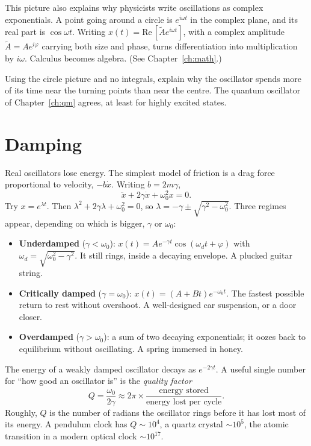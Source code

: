 This picture also explains why physicists write oscillations as complex exponentials. A point going around a circle is $e^{i\omega t}$ in the complex plane, and its real part is $\cos\omega t$. Writing $x(t) = \mathrm{Re}\,[\tilde A e^{i\omega t}]$, with a complex amplitude $\tilde A = Ae^{i\varphi}$ carrying both size and phase, turns differentiation into multiplication by $i\omega$. Calculus becomes algebra. (See Chapter~\ref{ch:math}.)

\begin{exercise}
Using the circle picture and no integrals, explain why the oscillator spends more of its time near the turning points than near the centre. The quantum oscillator of Chapter~\ref{ch:qm} agrees, at least for highly excited states.
\end{exercise}

\section{Damping}

Real oscillators lose energy. The simplest model of friction is a drag force proportional to velocity, $-b\dot x$. Writing $b = 2m\gamma$,
\[
  \ddot x + 2\gamma \dot x + \omega_0^2 x = 0 .
\]
Try $x = e^{\lambda t}$. Then $\lambda^2 + 2\gamma\lambda + \omega_0^2 = 0$, so $\lambda = -\gamma \pm \sqrt{\gamma^2 - \omega_0^2}$. Three regimes appear, depending on which is bigger, $\gamma$ or $\omega_0$:
\begin{itemize}[itemsep=3pt]
  \item \textbf{Underdamped} ($\gamma < \omega_0$): $x(t) = Ae^{-\gamma t}\cos(\omega_d t + \varphi)$ with $\omega_d = \sqrt{\omega_0^2-\gamma^2}$. It still rings, inside a decaying envelope. A plucked guitar string.
  \item \textbf{Critically damped} ($\gamma = \omega_0$): $x(t) = (A + Bt)e^{-\omega_0 t}$. The fastest possible return to rest without overshoot. A well-designed car suspension, or a door closer.
  \item \textbf{Overdamped} ($\gamma > \omega_0$): a sum of two decaying exponentials; it oozes back to equilibrium without oscillating. A spring immersed in honey.
\end{itemize}
The energy of a weakly damped oscillator decays as $e^{-2\gamma t}$. A useful single number for ``how good an oscillator is'' is the \emph{quality factor}
\[
  Q = \frac{\omega_0}{2\gamma} \approx 2\pi\times\frac{\text{energy stored}}{\text{energy lost per cycle}}.
\]
Roughly, $Q$ is the number of radians the oscillator rings before it has lost most of its energy. A pendulum clock has $Q\sim 10^4$, a quartz crystal $\sim 10^5$, the atomic transition in a modern optical clock $\sim 10^{17}$.

